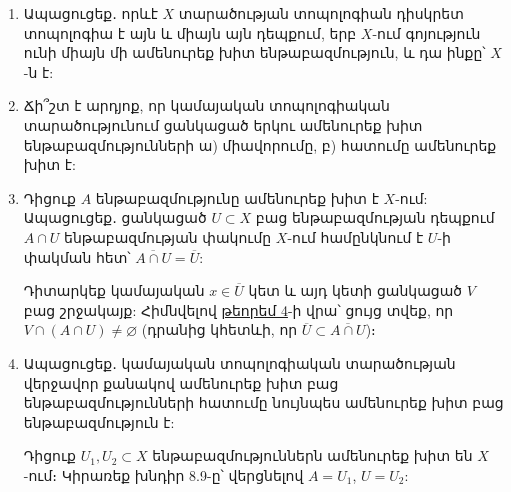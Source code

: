 \begin{enumerate}[label=\thesection.\arabic*.]
\item Ապացուցեք․ որևէ $X$ տարածության տոպոլոգիան դիսկրետ տոպոլոգիա է այն և միայն այն դեպքում, երբ $X$-ում գոյություն ունի միայն մի ամենուրեք խիտ ենթաբազմություն, և դա ինքը՝ $X$-ն է:

\item Ճի՞շտ է արդյոք, որ կամայական տոպոլոգիական տարածությունում ցանկա\-ցած երկու ամենուրեք խիտ ենթաբազմությունների ա) միավորումը, բ) հա\-տումը ամենուրեք խիտ է:

\item Դիցուք $A$ ենթաբազմությունը ամենուրեք խիտ է $X$-ում: Ապացուցեք․ ցան\-կա\-ցած $U \subset X$ բաց ենթաբազմության դեպքում $A \cap U$ ենթաբազմության փակումը $X$-ում համընկնում է $U$-ի փակման հետ՝ $\overline{A \cap U} = \overline{U}$:

\begin{hint}
Դիտարկեք կամայական $x \in \overline{U}$ կետ և այդ կետի ցանկացած $V$ բաց շրջակայք: Հիմնվելով \hyperref[ch8thm4]{թեորեմ 4}-ի վրա՝ ցույց տվեք, որ $V \cap (A \cap U) \neq \varnothing$ (դրանից կհետևի, որ $\overline{U} \subset \overline{A \cap U}$)։
\end{hint}

\item Ապացուցեք․ կամայական տոպոլոգիական տարածության վերջավոր քա\-նա\-կով ամենուրեք խիտ բաց ենթաբազմությունների հատումը նույնպես ամենու\-րեք խիտ բաց ենթաբազմություն է:

\begin{hint}
    Դիցուք $U_1, U_2 \subset X$ ենթաբազմություններն ամենուրեք խիտ են $X$-ում։ Կիրառեք խնդիր 8.9-ը՝ վերցնելով $A=U_1$, $U=U_2$:
\end{hint}

\end{enumerate}
